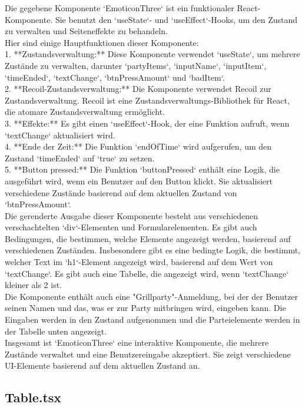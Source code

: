\documentclass[./dokumentation.tex]{subfiles}
\begin{document}
Die gegebene Komponente `EmoticonThree` ist ein funktionaler React-Komponente. Sie benutzt den `useState`- und `useEffect`-Hooks, um den Zustand zu verwalten und Seiteneffekte zu behandeln.\\ 
Hier sind einige Hauptfunktionen dieser Komponente:\\
1. **Zustandsverwaltung:** Diese Komponente verwendet `useState`, um mehrere Zustände zu verwalten, darunter `partyItems`, `inputName`, `inputItem`, `timeEnded`, `textChange`, `btnPressAmount` und `badItem`.\\
2. **Recoil-Zustandsverwaltung:** Die Komponente verwendet Recoil zur Zustandsverwaltung. Recoil ist eine Zustandsverwaltungs-Bibliothek für React, die atomare Zustandsverwaltung ermöglicht.\\
3. **Effekte:** Es gibt einen `useEffect`-Hook, der eine Funktion aufruft, wenn `textChange` aktualisiert wird.\\
4. **Ende der Zeit:** Die Funktion `endOfTime` wird aufgerufen, um den Zustand `timeEnded` auf `true` zu setzen.\\
5. **Button pressed:** Die Funktion `buttonPressed` enthält eine Logik, die ausgeführt wird, wenn ein Benutzer auf den Button klickt. Sie aktualisiert verschiedene Zustände basierend auf dem aktuellen Zustand von `btnPressAmount`.\\
Die gerenderte Ausgabe dieser Komponente besteht aus verschiedenen verschachtelten `div`-Elementen und Formularelementen. Es gibt auch Bedingungen, die bestimmen, welche Elemente angezeigt werden, basierend auf verschiedenen Zuständen. Insbesondere gibt es eine bedingte Logik, die bestimmt, welcher Text im `h1`-Element angezeigt wird, basierend auf dem Wert von `textChange`. Es gibt auch eine Tabelle, die angezeigt wird, wenn `textChange` kleiner als 2 ist.\\
Die Komponente enthält auch eine "Grillparty"-Anmeldung, bei der der Benutzer seinen Namen und das, was er zur Party mitbringen wird, eingeben kann. Die Eingaben werden in den Zustand aufgenommen und die Parteielemente werden in der Tabelle unten angezeigt.\\
Insgesamt ist `EmoticonThree` eine interaktive Komponente, die mehrere Zustände verwaltet und eine Benutzereingabe akzeptiert. Sie zeigt verschiedene UI-Elemente basierend auf dem aktuellen Zustand an.
\subsection{Table.tsx}
\end{document}
